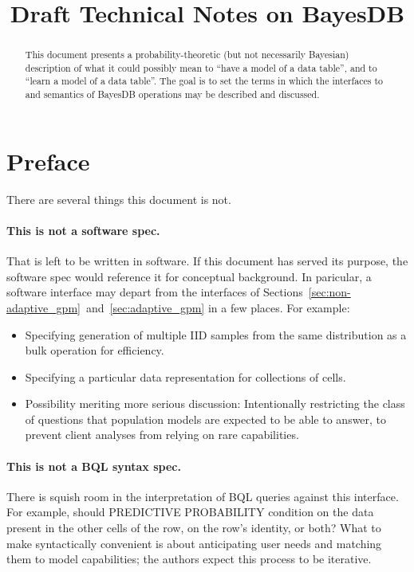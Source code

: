 \documentclass[10pt,letterpaper]{article}
\title{Draft Technical Notes on BayesDB}
\begin{document}
\maketitle

\begin{abstract}
This document presents a probability-theoretic (but not necessarily
Bayesian) description of what it could possibly mean to ``have a model
of a data table'', and to ``learn a model of a data table''.  The goal
is to set the terms in which the interfaces to and semantics of
BayesDB operations may be described and discussed.
\end{abstract}

\section{Preface}

There are several things this document is not.

\paragraph{This is not a software spec.}  That is left to be
written in software.  If this document has served its purpose, the
software spec would reference it for conceptual background.  In
paricular, a software interface may depart from the interfaces of
Sections~\ref{sec:non-adaptive_gpm}~and~\ref{sec:adaptive_gpm} in
a few places.  For example:
\begin{itemize}
\item Specifying generation of multiple IID samples from the same
  distribution as a bulk operation for efficiency.
\item Specifying a particular data representation for collections of cells.
\item Possibility meriting more serious discussion: Intentionally
  restricting the class of questions that population models are
  expected to be able to answer, to prevent client analyses from
  relying on rare capabilities.
\end{itemize}

\paragraph{This is not a BQL syntax spec.}  There is squish room
in the interpretation of BQL queries against this interface.  For
example, should PREDICTIVE PROBABILITY condition on the data present
in the other cells of the row, on the row's identity, or both?  What
to make syntactically convenient is about anticipating user needs and
matching them to model capabilities; the authors expect this process to be
iterative.
\end{document}
